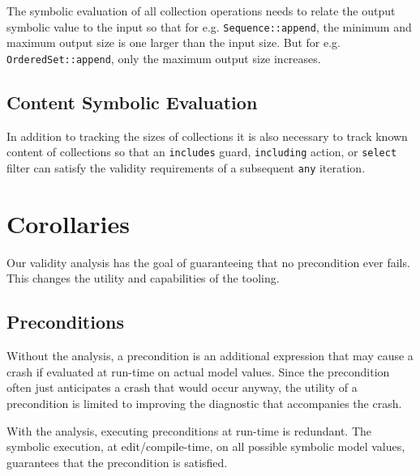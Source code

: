 \documentclass[
]{ceurart}
\begin{document}
The symbolic evaluation of all collection operations needs to relate the output symbolic value to the input so that for e.g. \verb|Sequence::append|, the minimum and maximum output size is one larger than the input size. But for e.g.
\verb|OrderedSet::append|, only the maximum output size increases.


\subsection{Content Symbolic Evaluation}

In addition to tracking the sizes of collections it is also necessary to track known content of collections so that an \verb|includes| guard, \verb|including| action, or \verb|select| filter can satisfy the validity requirements of a subsequent \verb|any| iteration.


\section{Corollaries}\label{Corollaries}

Our validity analysis has the goal of guaranteeing that no precondition ever fails. This changes the utility and capabilities of the tooling.

\subsection{Preconditions}

Without the analysis, a precondition is an additional expression that may cause a crash if evaluated at run-time on actual model values. Since the precondition often just anticipates a crash that would occur anyway, the utility of a precondition is limited to improving the diagnostic that accompanies the crash.

With the analysis, executing preconditions at run-time is redundant. The symbolic execution, at edit/compile-time, on all possible symbolic model values, guarantees that the precondition is satisfied.
\end{document}
